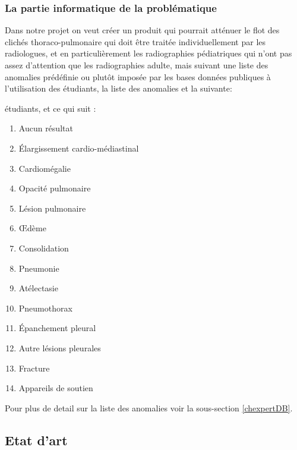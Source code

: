             \subsubsection{La partie informatique de la problématique}\label{partie_info}
            Dans notre projet on veut créer un produit qui pourrait atténuer le flot des clichés thoraco-pulmonaire qui doit être traitée individuellement par les radiologues, et en particulièrement les radiographies pédiatriques qui n’ont pas assez d’attention que les radiographies adulte, mais suivant une liste des anomalies prédéfinie ou plutôt imposée par les bases données publiques à l’utilisation des étudiants, la liste des anomalies et la suivante:
            
            étudiants, et ce qui suit :
                \begin{multicols}{2}\label{list_dia}
                    \begin{enumerate}
                        \item Aucun résultat
                        \item Élargissement cardio-médiastinal
                        \item Cardiomégalie
                        \item Opacité pulmonaire
                        \item Lésion pulmonaire
                        \item Œdème
                        \item Consolidation
                        \item Pneumonie
                        \item Atélectasie
                        \item Pneumothorax
                        \item Épanchement pleural
                        \item Autre lésions pleurales 
                        \item Fracture
                        \item Appareils de soutien
                    \end{enumerate}
                \end{multicols}

                Pour plus de detail sur la liste des anomalies voir la sous-section \ref{chexpertDB}.

        \subsection{Etat d'art}
